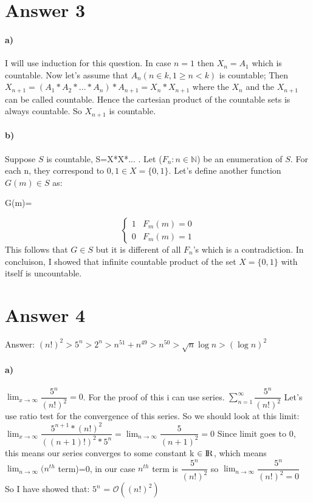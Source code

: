 \documentclass[12pt]{article}
\begin{document}
\section*{Answer 3}
\paragraph{a)}
I will use induction for this question. In case $n=1$ then $X_n=A_1$ which is countable. Now let's assume that $A_n (n \in k, 1\geq n<k)$ is countable; Then $X_{n+1}=(A_1*A_2*...*A_n)*A_{n+1}=X_n*X_{n+1}$ where the $X_n$ and the $X_{n+1}$ can be called countable. Hence the cartesian product of the countable sets is always countable. So $X_{n+1}$ is countable.


\paragraph{b)}
Suppose $S$ is countable, S=X*X*... . Let ($F_n: n \in \mathbb{N}$) be an enumeration of $S$. For each n, they correspond to $0, 1 \in X=\{0,1\} $. Let's define another function $G(m) \in S$ as:

G(m)=

\[ \begin{cases}
      1 & F_m (m)=0 \\
      0 & F_m(m)=1 
   \end{cases}
\]
This follows that $G \in S$ but it is different of all $F_n$'s which is a contradiction. In concluison, I showed that infinite countable product of the set $X = \{0, 1\}$ with itself is uncountable.


\section*{Answer 4}

Answer:
$(n!)^2>5^n>2^n>n^{51}+n^{49}>n^{50}>\sqrt{n}\log n>(\log n)^2$

\paragraph{a)} %
$\lim_{x \to \infty} \dfrac {5^n}{(n!)^2}=0$. For the proof of this i can use series. $\sum_{n=1}^{\infty}\dfrac {5^n}{(n!)^2}$ Let's use ratio test for the convergence of this series. So we should look at this limit: $\lim_{x \to \infty} \dfrac{5^{n+1}*(n!)^2}{((n+1)!)^2*5^n}=\lim_{n \to \infty} \dfrac{5}{(n+1)^2}=0$ Since limit goes to $0$, this means our series converges to some constant k $\in \rm I\!R$, which means $\lim_{n \to \infty} (n^{th}$ term)=0, in our case  $n^{th}$ term is $\dfrac {5^n}{(n!)^2}$ so $\lim_{n \to \infty} \dfrac {5^n}{(n!)^2=0}$ So I have showed that: $5^n$ = $\mathcal{O}((n!)^2)$
\end{document}
